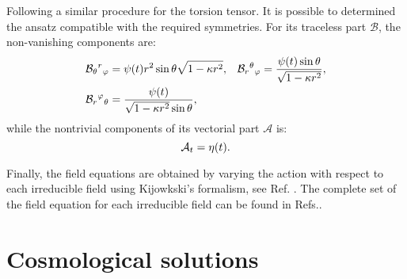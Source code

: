 Following a similar procedure for the torsion tensor. It is possible to determined the ansatz compatible with 
the required symmetries. For its traceless part $\mathcal{B}$, the non-vanishing components are:
\begin{equation}
\label{B_ansatz}
\begin{aligned}
    \mathcal{B}_{\theta}{}^{ r}{}_{\varphi} & = \psi (t) r^2\sin\theta \sqrt{1 - \kappa r^2}, &
    \mathcal{B}_{r}{}^{ \theta}{}_{\varphi} & =\frac{\psi (t) \sin \theta}{\sqrt{1 - \kappa r^2}}, \\
    \mathcal{B}_{r}{}^{ \varphi}{}_{\theta} & =\frac{\psi(t)}{ \sqrt{1-\kappa r^{2}} \sin \theta},
\end{aligned}
\end{equation}
while the nontrivial components of its vectorial part $\mathcal{A}$ is:
\begin{equation}
    \label{A_ansatz}
    \mathcal{A}_{t} = \eta(t).
\end{equation}

Finally, the field equations are obtained by varying the action with respect to each irreducible field using Kijowkski's 
formalism, see Ref. \cite{KJ_Formalism,Castillo_Felisola_2020}. The complete  set of the field equation for 
each irreducible field can be found in Refs.\cite{Castillo_Felisola_2020,Castillo-Felisola_2023}.

\section{Cosmological solutions}
\label{sec:solutions}

